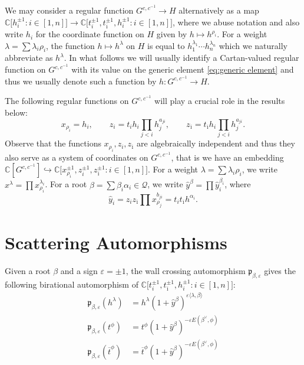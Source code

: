 \documentclass{amsart}
\numberwithin{theorem}{section}
\newcommand{\cQ}{\mathcal{Q}}
\newcommand{\fp}{\mathfrak{p}}
\newcommand{\CC}{\mathbb{C}}
\newcommand{\into}{\hookrightarrow}
\newcommand{\oi}{{\overline{\imath}}}
\newcommand{\ot}{{\overline{t}}}
\begin{document}
    We may consider a regular function $G^{c,c^{-1}}\to H$ alternatively as a map $\CC\big[h_i^{\pm1}:i\in[1,n]\big]\to \CC\big[t_i^{\pm1},t_\oi^{\pm1},h_i^{\pm1}:i\in[1,n]\big]$, where we abuse notation and also write $h_i$ for the coordinate function on $H$ given by $h\mapsto h^{\rho_i}$.
    For a weight $\lambda=\sum\lambda_i\rho_i$, the function $h\mapsto h^\lambda$ on $H$ is equal to $h_1^{\lambda_1}\cdots h_n^{\lambda_n}$ which we naturally abbreviate as $h^\lambda$.
    In what follows we will usually identify a Cartan-valued regular function on $G^{c,c^{-1}}$ with its value on the generic element \eqref{eq:generic element} and thus we usually denote such a function by $h:G^{c,c^{-1}}\to H$.

    The following regular functions on $G^{c,c^{-1}}$ will play a crucial role in the results below:
    \[x_{\rho_i}=h_i,\qquad z_i=t_i h_i\prod_{j<i} h_j^{a_{ji}},\qquad z_\oi=t_\oi h_i\prod_{j<i} h_j^{a_{ji}}.\]
    Observe that the functions $x_{\rho_i},z_i,z_\oi$ are algebraically independent and thus they also serve as a system of coordinates on $G^{c,c^{-1}}$, that is we have an embedding $\CC[G^{c,c^{-1}}]\into\CC\big[x_{\rho_i}^{\pm1},z_i^{\pm1},z_\oi^{\pm1}:i\in[1,n]\big]$.
    For a weight $\lambda=\sum \lambda_i\rho_i$, we write $x^\lambda=\prod x_{\rho_i}^{\lambda_i}$.
    For a root $\beta=\sum \beta_i\alpha_i\in\cQ$, we write $\hat y^\beta=\prod \hat y_i^{\beta_i}$, where 
    \[\hat y_i=z_i z_\oi \prod x_{\rho_j}^{b_{ji}}=t_i t_\oi h^{\alpha_i}.\]

  \section{Scattering Automorphisms}
    Given a root $\beta$ and a sign $\varepsilon=\pm1$, the wall crossing automorphism $\fp_{\beta,\varepsilon}$ gives the following birational automorphism of $\CC\big[t_i^{\pm1},t_\oi^{\pm1},h_i^{\pm1}:i\in[1,n]\big]$: 
    \begin{align*}
      \fp_{\beta,\varepsilon}(h^\lambda) &= h^\lambda (1+\hat y^\beta)^{\varepsilon \langle\lambda,\beta\rangle}\\
      \fp_{\beta,\varepsilon}(t^\phi) &= t^\phi (1+\hat y^\beta)^{-\varepsilon E(\beta^\vee,\phi)}\\
      \fp_{\beta,\varepsilon}(\ot^\phi) &= \ot^\phi (1+\hat y^\beta)^{-\varepsilon E(\beta^\vee,\phi)}\\
    \end{align*}
\end{document}
